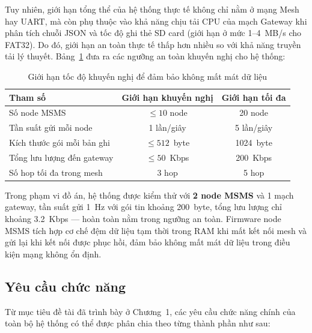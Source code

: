 \documentclass{article} %
\begin{document}
Tuy nhiên, giới hạn tổng thể của hệ thống thực tế không chỉ nằm ở mạng Mesh hay UART, mà còn phụ thuộc vào khả năng chịu tải CPU của mạch Gateway khi phân tích chuỗi JSON và tốc độ ghi thẻ SD card (giới hạn ở mức 1--4~MB/s cho FAT32). Do đó, giới hạn an toàn thực tế thấp hơn nhiều so với khả năng truyền tải lý thuyết. Bảng~\ref{tab:rate_limit} đưa ra các ngưỡng an toàn khuyến nghị cho hệ thống:
\begin{table}[H]
    \centering
    \caption{Giới hạn tốc độ khuyến nghị để đảm bảo không mất mát dữ liệu}
    \label{tab:rate_limit}
    \renewcommand{\arraystretch}{1.3}
    \begin{tabular}{|l|c|c|}
    \hline
    \textbf{Tham số} & \textbf{Giới hạn khuyến nghị} & \textbf{Giới hạn tối đa} \\
    \hline
    Số node MSMS & $\leq 10$ node & 20 node \\
    Tần suất gửi mỗi node & 1 lần/giây & 5 lần/giây \\
    Kích thước gói mỗi bản ghi & $\leq 512$~byte & 1024~byte \\
    Tổng lưu lượng đến gateway & $\leq 50$~Kbps & 200~Kbps \\
    Số hop tối đa trong mesh & 3 hop & 5 hop \\
    \hline
    \end{tabular}
\end{table}
Trong phạm vi đồ án, hệ thống được kiểm thử với \textbf{2 node MSMS} và 1 mạch gateway, tần suất gửi 1~Hz với gói tin khoảng 200~byte, tổng lưu lượng chỉ khoảng 3.2~Kbps — hoàn toàn nằm trong ngưỡng an toàn. Firmware node MSMS tích hợp cơ chế đệm dữ liệu tạm thời trong RAM khi mất kết nối mesh và gửi lại khi kết nối được phục hồi, đảm bảo không mất mát dữ liệu trong điều kiện mạng không ổn định.

\subsection{Yêu cầu chức năng}
\label{yeucauchucnang}
Từ mục tiêu đề tài đã trình bày ở Chương~1, các yêu cầu chức năng chính của toàn bộ hệ thống có thể được phân chia theo từng thành phần như sau:
\end{document}
